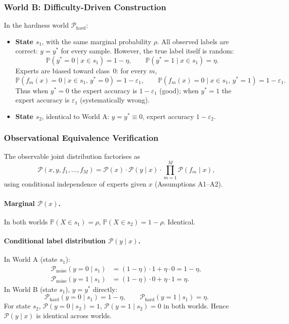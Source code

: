 \subsubsection{World B: Difficulty-Driven Construction}
\label{sec:thm3_worldB}

In the hardness world $\mathcal{P}_{\text{hard}}$:

\begin{itemize}
  \item \textbf{State $s_1$}, with the same marginal probability $\rho$.
    All observed labels are correct: $y=y^*$ for every sample.  However, the
    true label itself is random:
    \[
    \mathbb{P}(y^*=0 \mid x\in s_1)=1-\eta,\qquad
    \mathbb{P}(y^*=1 \mid x\in s_1)=\eta.
    \]
    Experts are biased toward class~0: for every $m$,
    \[
    \mathbb{P}(f_m(x)=0 \mid x\in s_1,\,y^*=0)=1-\varepsilon_1,\qquad
    \mathbb{P}(f_m(x)=0 \mid x\in s_1,\,y^*=1)=1-\varepsilon_1.
    \]
    Thus when $y^*=0$ the expert accuracy is $1-\varepsilon_1$ (good); when
    $y^*=1$ the expert accuracy is $\varepsilon_1$ (systematically wrong).
  \item \textbf{State $s_2$}, identical to World A: $y=y^*\equiv0$, expert
    accuracy $1-\varepsilon_2$.
\end{itemize}

\subsubsection{Observational Equivalence Verification}
\label{sec:thm3_verification}

The observable joint distribution factorises as
\[
\mathcal{P}(x,y,f_1,\dots,f_M)
= \mathcal{P}(x)\cdot\mathcal{P}(y\mid x)\cdot\prod_{m=1}^M\mathcal{P}(f_m\mid x),
\]
using conditional independence of experts given $x$ (Assumptions A1--A2).

\paragraph{Marginal $\mathcal{P}(x)$.}
In both worlds $\mathbb{P}(X\in s_1)=\rho$,
$\mathbb{P}(X\in s_2)=1-\rho$.  Identical.

\paragraph{Conditional label distribution $\mathcal{P}(y\mid x)$.}
In World A (state $s_1$):
\[
\begin{aligned}
\mathcal{P}_{\text{noise}}(y=0\mid s_1)
&= (1-\eta)\cdot1 + \eta\cdot0 = 1-\eta,\\
\mathcal{P}_{\text{noise}}(y=1\mid s_1)
&= (1-\eta)\cdot0 + \eta\cdot1 = \eta.
\end{aligned}
\]
In World B (state $s_1$), $y=y^*$ directly:
\[
\mathcal{P}_{\text{hard}}(y=0\mid s_1)=1-\eta,\qquad
\mathcal{P}_{\text{hard}}(y=1\mid s_1)=\eta.
\]
For state $s_2$, $\mathcal{P}(y=0\mid s_2)=1$,
$\mathcal{P}(y=1\mid s_2)=0$ in both worlds.  Hence
$\mathcal{P}(y\mid x)$ is identical across worlds.

